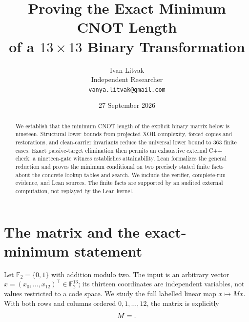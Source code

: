\documentclass[11pt]{article}
\title{Proving the Exact Minimum CNOT Length\\of a $13\times13$ Binary Transformation}
\author{Ivan Litvak\\Independent Researcher\\
\texttt{vanya.litvak@gmail.com}}
\date{27 September 2026}
\newcommand{\F}{\mathbb F_2}
\begin{document}
\maketitle
\begin{abstract}
We establish that the minimum CNOT length of the explicit binary matrix
below is nineteen. Structural lower bounds from projected XOR complexity,
forced copies and restorations, and clean-carrier invariants reduce the
universal lower bound to 363 finite cases. Exact passive-target elimination
then permits an exhaustive external C++ check; a nineteen-gate witness
establishes attainability. Lean formalizes the general reduction and proves
the minimum conditional on two precisely stated finite facts about the
concrete lookup tables and search. We include the verifier, complete-run
evidence, and Lean sources. The finite facts are supported by an audited
external computation, not replayed by the Lean kernel.
\end{abstract}

\section{The matrix and the exact-minimum statement}
Let $\F=\{0,1\}$ with addition modulo two. The input is an arbitrary vector
$x=(x_0,\ldots,x_{12})^\top\in\F^{13}$; its thirteen coordinates are
independent variables, not values restricted to a code space. We study the
full labelled linear map $x\mapsto Mx$. With both rows and columns ordered
$0,1,\ldots,12$, the matrix is explicitly
\begin{equation}\label{eq:matrix}
M=\begingroup\setlength{\arraycolsep}{4pt}\renewcommand{\arraystretch}{.85}
\endgroup.
\end{equation}
\end{document}
